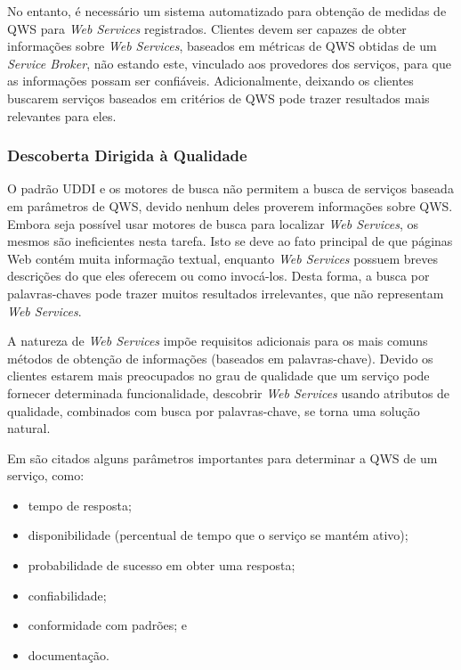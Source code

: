 No entanto, é necessário um sistema automatizado para obtenção de medidas de QWS para \textit{Web Services} registrados. Clientes devem ser capazes de obter informações sobre \textit{Web Services}, baseados em métricas de QWS obtidas de um \textit{Service Broker}, não estando este, vinculado aos provedores dos serviços, para que as informações possam ser confiáveis. Adicionalmente, deixando os clientes buscarem serviços baseados em critérios de QWS pode trazer resultados mais relevantes para eles.

\subsubsection{Descoberta Dirigida à Qualidade}

O padrão UDDI e os motores de busca não permitem a busca de serviços baseada em parâmetros de QWS, devido nenhum deles proverem informações sobre QWS. Embora seja possível usar motores de busca para localizar \textit{Web Services}, os mesmos são ineficientes nesta tarefa. Isto se deve ao fato principal de que páginas Web contém muita informação textual, enquanto \textit{Web Services} possuem breves descrições do que eles oferecem ou como invocá-los. Desta forma, a busca por palavras-chaves pode trazer muitos resultados irrelevantes, que não representam \textit{Web Services}.

A natureza de \textit{Web Services} impõe requisitos adicionais para os mais comuns métodos de obtenção de informações (baseados em palavras-chave). Devido os clientes estarem mais preocupados no grau de qualidade que um serviço pode fornecer determinada funcionalidade, descobrir \textit{Web Services} usando atributos de qualidade, combinados com busca por palavras-chave, se torna uma solução natural.

Em \cite{al2008toward} são citados alguns parâmetros importantes para determinar a QWS de um serviço, como:

\begin{itemize}
	\item tempo de resposta;
  \item disponibilidade (percentual de tempo que o serviço se mantém ativo);
  \item probabilidade de sucesso em obter uma resposta;
  \item confiabilidade;
  \item conformidade com padrões; e 
  \item documentação.
\end{itemize}


